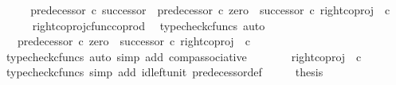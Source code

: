 \begin{isabellebody}
%
\isadelimproof
%
\endisadelimproof
%
\isatagproof
{}\isamarkupfalse%
\ {\isacharminus}{\kern0pt}\isanewline
\ \ \isamarkupfalse%
\ {\isachardoublequoteopen}predecessor{\isacharprime}{\kern0pt}\ {\isasymcirc}\isactrlsub c\ successor\ {\isacharequal}{\kern0pt}\ predecessor{\isacharprime}{\kern0pt}\ {\isasymcirc}\isactrlsub c\ {\isacharparenleft}{\kern0pt}zero\ {\isasymamalg}\ successor{\isacharparenright}{\kern0pt}\ {\isasymcirc}\isactrlsub c\ right{\isacharunderscore}{\kern0pt}coproj\ {\isasymone}\ {\isasymnat}\isactrlsub c{\isachardoublequoteclose}\isanewline
\ \ \ \ \isamarkupfalse%
\ right{\isacharunderscore}{\kern0pt}coproj{\isacharunderscore}{\kern0pt}cfunc{\isacharunderscore}{\kern0pt}coprod\ \isamarkupfalse%
\ {\isacharparenleft}{\kern0pt}typecheck{\isacharunderscore}{\kern0pt}cfuncs{\isacharcomma}{\kern0pt}\ auto{\isacharparenright}{\kern0pt}\isanewline
\ \ \isamarkupfalse%
\ \isamarkupfalse%
\ {\isachardoublequoteopen}{\isachardot}{\kern0pt}{\isachardot}{\kern0pt}{\isachardot}{\kern0pt}\ {\isacharequal}{\kern0pt}\ {\isacharparenleft}{\kern0pt}predecessor{\isacharprime}{\kern0pt}\ {\isasymcirc}\isactrlsub c\ {\isacharparenleft}{\kern0pt}zero\ {\isasymamalg}\ successor{\isacharparenright}{\kern0pt}{\isacharparenright}{\kern0pt}\ {\isasymcirc}\isactrlsub c\ right{\isacharunderscore}{\kern0pt}coproj\ {\isasymone}\ {\isasymnat}\isactrlsub c{\isachardoublequoteclose}\isanewline
\ \ \ \ \isamarkupfalse%
\ {\isacharparenleft}{\kern0pt}typecheck{\isacharunderscore}{\kern0pt}cfuncs{\isacharcomma}{\kern0pt}\ auto\ simp\ add{\isacharcolon}{\kern0pt}\ comp{\isacharunderscore}{\kern0pt}associative{}{\isacharparenright}{\kern0pt}\isanewline
\ \ \isamarkupfalse%
\ \isamarkupfalse%
\ {\isachardoublequoteopen}{\isachardot}{\kern0pt}{\isachardot}{\kern0pt}{\isachardot}{\kern0pt}\ {\isacharequal}{\kern0pt}\ right{\isacharunderscore}{\kern0pt}coproj\ {\isasymone}\ {\isasymnat}\isactrlsub c{\isachardoublequoteclose}\isanewline
\ \ \ \ \isamarkupfalse%
\ {\isacharparenleft}{\kern0pt}typecheck{\isacharunderscore}{\kern0pt}cfuncs{\isacharcomma}{\kern0pt}\ simp\ add{\isacharcolon}{\kern0pt}\ id{\isacharunderscore}{\kern0pt}left{\isacharunderscore}{\kern0pt}unit{}\ predecessor{\isacharprime}{\kern0pt}{\isacharunderscore}{\kern0pt}def{}{\isacharparenright}{\kern0pt}\isanewline
\ \ \isamarkupfalse%
\ \isamarkupfalse%
\ {\isacharquery}{\kern0pt}thesis\isacommand{{\isachardot}{\kern0pt}}\isamarkupfalse%

\end{isabellebody}

